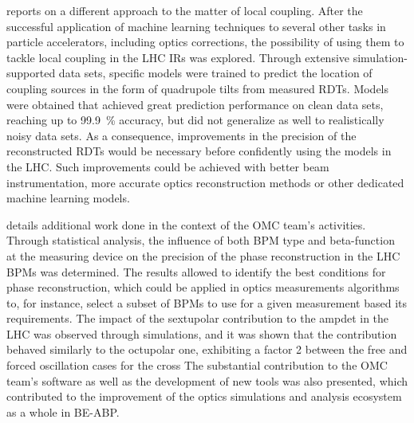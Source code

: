  reports on a different approach to the matter of local coupling.
After the successful application of machine learning techniques to several other tasks in particle accelerators, including optics corrections, the possibility of using them to tackle local coupling in the \gls{LHC} \glspl{IR} was explored.
Through extensive simulation-supported data sets, specific models were trained to predict the location of coupling sources in the form of quadrupole tilts from measured \glspl{RDT}.
Models were obtained that achieved great prediction performance on clean data sets, reaching up to \qty{99.9}{\percent} accuracy, but did not generalize as well to realistically noisy data sets.
As a consequence, improvements in the precision of the reconstructed \glspl{RDT} would be necessary before confidently using the models in the \gls{LHC}.
Such improvements could be achieved with better beam instrumentation, more accurate optics reconstruction methods or other dedicated machine learning models.
\break 

 details additional work done in the context of the \gls{OMC} team's activities.
Through statistical analysis, the influence of both \gls{BPM} type and \gls{beta-function} at the measuring device on the precision of the phase reconstruction in the \gls{LHC} \glspl{BPM} was determined.
The results allowed to identify the best conditions for phase reconstruction, which could be applied in optics measurements algorithms to, for instance, select a subset of \glspl{BPM} to use for a given measurement based its requirements.
The impact of the sextupolar contribution to the \gls{ampdet} in the \gls{LHC} was observed through simulations, and it was shown that the contribution behaved similarly to the octupolar one, exhibiting a factor \num{2} between the free and forced oscillation cases for the cross
The substantial contribution to the \gls{OMC} team's software as well as the development of new tools was also presented, which contributed to the improvement of the optics simulations and analysis ecosystem as a whole in \acrshort{BE}-\acrshort{ABP}.



\glsresetall                                     %
